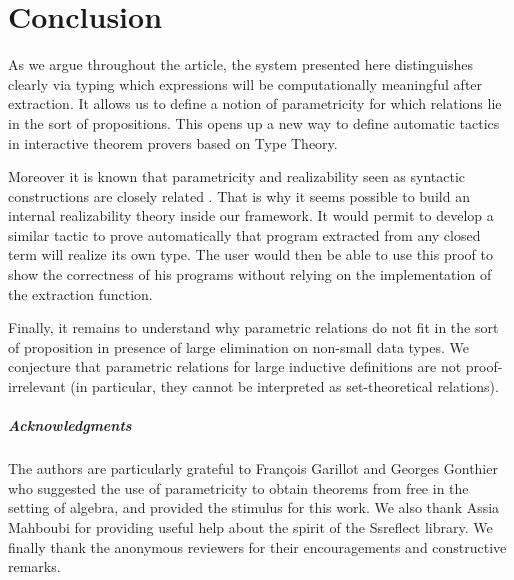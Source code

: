 \documentclass[a4paper,USenglish]{lipics}
\begin{document}
\section{Conclusion}

As we argue throughout the article, the system presented here
distinguishes clearly via typing which expressions will be computationally
meaningful after extraction. It allows us to define a notion of parametricity
for which relations lie in the sort of propositions. This opens up a new way
to define automatic tactics in interactive theorem provers based on Type
Theory.

Moreover it is known that parametricity and realizability seen as syntactic
constructions are closely related \cite{DBLP:conf/fossacs/BernardyL11}. That is why it seems
possible to build an internal realizability theory inside our framework. It
would permit to develop a similar tactic to prove automatically that program
extracted from any closed term will realize its own type. The user would then
be able to use this proof to show the correctness of his programs without
relying on the implementation of the extraction function.


Finally, it remains to understand why parametric relations do not fit in the
sort of proposition in presence of large elimination on non-small data types.
We conjecture that parametric relations for large inductive definitions are
not proof-irrelevant (in particular, they cannot be interpreted as
set-theoretical relations).

\subparagraph*{Acknowledgments}

The authors are particularly grateful to François Garillot and Georges
Gonthier who suggested the use of parametricity to obtain theorems from
free in the setting of algebra, and provided the stimulus for this work.
We also thank Assia Mahboubi for providing useful help about the spirit
of the Ssreflect library. We finally thank the anonymous reviewers for
their encouragements and constructive remarks.





\end{document}
